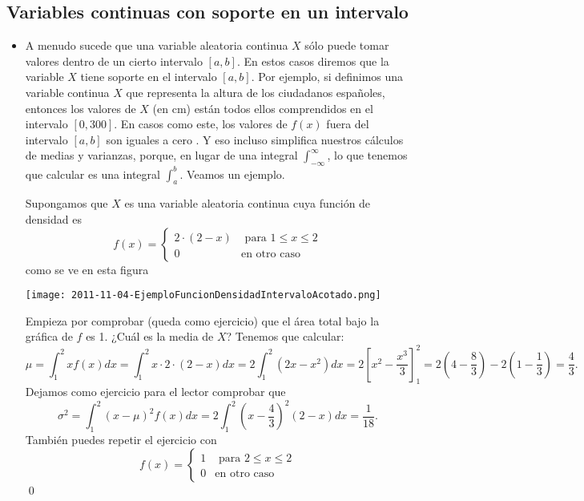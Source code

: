 \subsection*{Variables continuas con soporte en un intervalo}

\begin{itemize}

\item A menudo sucede que una variable aleatoria continua $X$ sólo puede tomar valores dentro de un cierto intervalo $[a,b]$. En estos casos diremos que {\sf la variable $X$ tiene soporte en el intervalo $[a,b]$}. Por ejemplo, si definimos una variable continua $X$ que representa la altura de los ciudadanos españoles, entonces los valores de $X$ (en cm) están todos ellos comprendidos en el intervalo $[0,300]$. En casos como este, los valores de $f(x)$ fuera del intervalo $[a,b]$ son iguales a cero . Y eso incluso simplifica nuestros cálculos de medias y varianzas, porque, en lugar de una integral $\int_{-\infty}^{\infty}$, lo que tenemos que calcular es una integral $\int_a^b$. Veamos un ejemplo.
    \begin{ejemplo}
    Supongamos que $X$ es una variable aleatoria continua cuya función de densidad es
    \[f(x)=\begin{cases}2\cdot(2-x)&\mbox{ para }1\leq x\leq 2\\ 0&\mbox{en otro caso}\end{cases}\]
    como se ve en esta figura
    \begin{center}
    \texttt{[image: 2011-11-04-EjemploFuncionDensidadIntervaloAcotado.png]}
    \end{center}
    Empieza por comprobar (queda como ejercicio) que el área total bajo la gráfica de $f$ es 1. ¿Cuál es la media de $X$? Tenemos que calcular:
    \[
    \mu=\int_{1}^{2}xf(x)dx=\int_{1}^{2}x\cdot 2\cdot(2-x)dx=2\int_{1}^{2}(2x-x^2)dx=2\left[x^2-\frac{x^3}{3}\right]_1^2=2\left(4-\frac{8}{3}\right)-2\left(1-\frac{1}{3}\right)=\dfrac{4}{3}.
    \]
    Dejamos como ejercicio para el lector comprobar que
    \[
    \sigma^2=\int_{1}^{2}(x-\mu)^2f(x)dx=2\int_{1}^{2}\left(x-\dfrac{4}{3}\right)^2(2-x)dx=\dfrac{1}{18}.
    \]
    También puedes repetir el ejercicio con
    \[f(x)=\begin{cases}1&\mbox{ para }2\leq x\leq 2\\ 0&\mbox{en otro caso}\end{cases}\]
    \qed

    \end{ejemplo}

\end{itemize}

